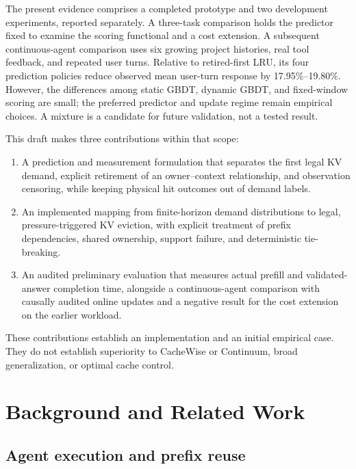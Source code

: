 \documentclass[sigconf, screen, review, balance=false]{acmart}
\providecommand{\tightlist}{\setlength{\itemsep}{0pt}\setlength{\parskip}{0pt}}
\begin{document}
The present evidence comprises a completed prototype and two development
experiments, reported separately. A three-task comparison holds the
predictor fixed to examine the scoring functional and a cost extension.
A subsequent continuous-agent comparison uses six growing project
histories, real tool feedback, and repeated user turns. Relative to
retired-first LRU, its four prediction policies reduce observed mean
user-turn response by 17.95\%--19.80\%. However, the differences among
static GBDT, dynamic GBDT, and fixed-window scoring are small; the
preferred predictor and update regime remain empirical choices. A
mixture is a candidate for future validation, not a tested result.

This draft makes three contributions within that scope:

\begin{enumerate}
\def\labelenumi{\arabic{enumi}.}
\tightlist
\item
  A prediction and measurement formulation that separates the first
  legal KV demand, explicit retirement of an owner--context
  relationship, and observation censoring, while keeping physical hit
  outcomes out of demand labels.
\item
  An implemented mapping from finite-horizon demand distributions to
  legal, pressure-triggered KV eviction, with explicit treatment of
  prefix dependencies, shared ownership, support failure, and
  deterministic tie-breaking.
\item
  An audited preliminary evaluation that measures actual prefill and
  validated-answer completion time, alongside a continuous-agent
  comparison with causally audited online updates and a negative result
  for the cost extension on the earlier workload.
\end{enumerate}

These contributions establish an implementation and an initial empirical
case. They do not establish superiority to CacheWise or Continuum, broad
generalization, or optimal cache control.

\section{Background and Related
Work}\label{background-and-related-work}

\subsection{Agent execution and prefix
reuse}\label{agent-execution-and-prefix-reuse}
\end{document}
